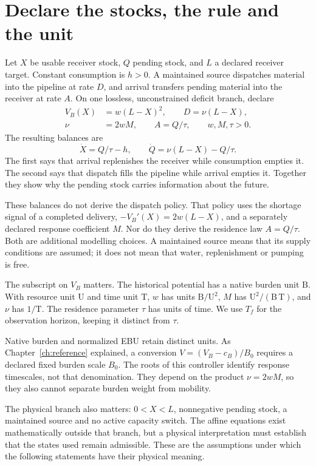 \section{Declare the stocks, the rule and the unit}
Let $X$ be usable receiver stock, $Q$ pending stock, and $L$ a declared receiver target. Constant consumption is $h>0$. A maintained source dispatches material into the pipeline at rate $D$, and arrival transfers pending material into the receiver at rate $A$. On one lossless, unconstrained deficit branch, declare
\begin{align}\label{eq:tank-laws}
 V_B(X)&=w(L-X)^2,\qquad D=\nu(L-X),\nonumber\\
 \nu&=2wM,\qquad A=Q/\tau,
 \qquad w,M,\tau>0.
\end{align}
The resulting balances are
\begin{equation}\label{eq:tank-generator}
 \dot X=Q/\tau-h,\qquad
 \dot Q=\nu(L-X)-Q/\tau.
\end{equation}
The first says that arrival replenishes the receiver while consumption empties it. The second says that dispatch fills the pipeline while arrival empties it. Together they show why the pending stock carries information about the future.

These balances do not derive the dispatch policy. That policy uses the shortage signal of a completed delivery, $-V_B'(X)=2w(L-X)$, and a separately declared response coefficient $M$. Nor do they derive the residence law $A=Q/\tau$. Both are additional modelling choices. A maintained source means that its supply conditions are assumed; it does not mean that water, replenishment or pumping is free.

The subscript on $V_B$ matters. The historical potential has a native burden unit $\mathrm B$. With resource unit $\mathrm U$ and time unit $\mathrm T$, $w$ has units $\mathrm B/\mathrm U^2$, $M$ has $\mathrm U^2/(\mathrm B\,\mathrm T)$, and $\nu$ has $1/\mathrm T$. The residence parameter $\tau$ has units of time. We use $T_f$ for the observation horizon, keeping it distinct from $\tau$.

Native burden and normalized EBU retain distinct units. As Chapter~\ref{ch:reference} explained, a conversion $V=(V_B-c_B)/B_0$ requires a declared fixed burden scale $B_0$. The roots of this controller identify response timescales, not that denomination. They depend on the product $\nu=2wM$, so they also cannot separate burden weight from mobility.

The physical branch also matters: $0<X<L$, nonnegative pending stock, a maintained source and no active capacity switch. The affine equations exist mathematically outside that branch, but a physical interpretation must establish that the states used remain admissible. These are the assumptions under which the following statements have their physical meaning.

